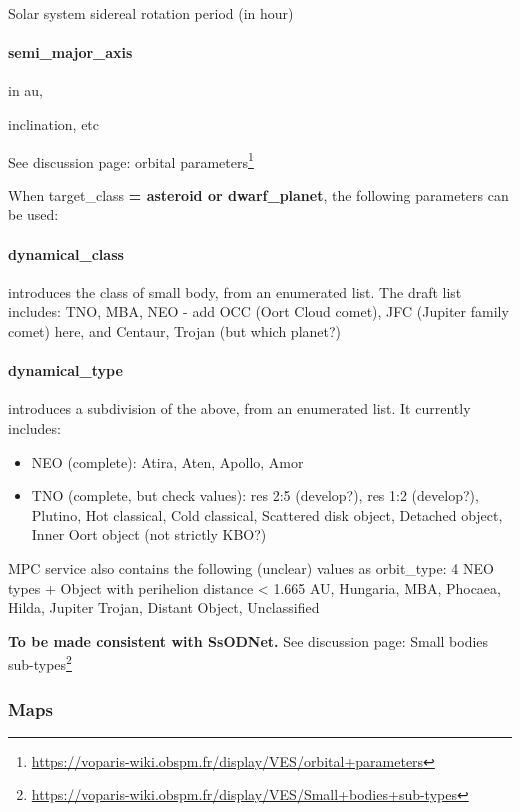 \documentclass[11pt,a4paper]{ivoa}
\begin{document}
Solar system sidereal rotation period (in hour)

\paragraph{semi\_major\_axis}

in au,

inclination, etc

See discussion page: orbital parameters\footnote{\url{https://voparis-wiki.obspm.fr/display/VES/orbital+parameters}}


When target\_class\textbf{ = asteroid or dwarf\_planet}, the following parameters can be used:\textbf{\\}

\paragraph{dynamical\_class}

introduces the class of small body, from an enumerated list. The draft list includes: TNO, MBA, NEO - add OCC (Oort Cloud comet), JFC (Jupiter family comet) here, and Centaur, Trojan (but which planet?)

\paragraph{dynamical\_type}

introduces a subdivision of the above, from an enumerated list. It currently includes:

\begin{itemize}
\item NEO (complete): Atira, Aten, Apollo, Amor
\item TNO (complete, but check values): res 2:5 (develop?), res 1:2 (develop?), Plutino, Hot classical, Cold classical, Scattered disk object, Detached object, Inner Oort object (not strictly KBO?)
\end{itemize}

MPC service also contains the following (unclear) values as orbit\_type: 4 NEO types + Object with perihelion distance < 1.665 AU, Hungaria, MBA, Phocaea, Hilda, Jupiter Trojan, Distant Object, Unclassified


\textbf{To be made consistent with SsODNet. }See discussion page: Small bodies sub-types\footnote{\url{https://voparis-wiki.obspm.fr/display/VES/Small+bodies+sub-types}}

\subsubsection{Maps}
\end{document}
